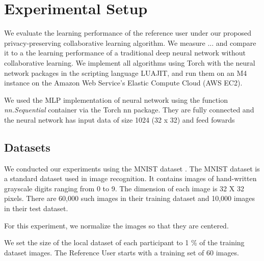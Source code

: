 \documentclass[conference]{IEEEtran}
\begin{document}
\section{Experimental Setup}

We evaluate the learning performance of the reference user under our proposed privacy-preserving collaborative learning algorithm. We
measure ... and compare it to a the learning performance of a traditional deep neural network without collaborative learning. 
We implement all algorithms using Torch with the neural network packages in the scripting language LUAJIT, and run them 
on an M4 instance on the Amazon Web Service's Elastic Compute Cloud (AWS EC2).

We used the MLP implementation of neural network using the function \textit{nn.Sequential} container via the Torch nn package. They are
fully connected and the neural network has input data of size 1024 (32 x 32) and feed fowards

\subsection{Datasets}
We conducted our experiments using the MNIST dataset \cite{deng2012mnist}. The MNIST dataset is a standard dataset used in image
recognition.
It contains images of hand-written grayscale digits ranging from 0 to 9. The dimension of each image is 32 X 32 pixels. There
are 60,000 such images in their training dataset and 10,000 images in their test dataset.

For this experiment, we normalize the images so that they are centered. 

We set the size of the local dataset of each participant to 1 \% of the training dataset images. 
The Reference User starts with a training set of 60 images.

\end{document}
